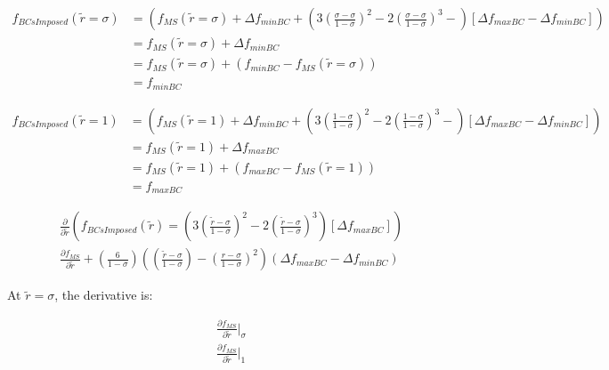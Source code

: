 \documentclass[a4paper]{article}
\begin{document}
\begin{align*}
    f_{BCsImposed}(\widetilde{r} = \sigma) 
    &=
    \left(
        f_{MS}(\widetilde{r} = \sigma) +
        \Delta f_{minBC} +
        \left( 3\left(  \frac{\sigma - \sigma}{1 - \sigma} \right)^2- 
          2\left(  \frac{\sigma - \sigma}{1 - \sigma} \right)^3- 
        \right)
        \left[ \Delta f_{maxBC} - \Delta f_{minBC}  \right] 
    \right)\\
    &=  f_{MS}(\widetilde{r} = \sigma) + \Delta f_{minBC}\\
    &=  f_{MS}(\widetilde{r} = \sigma) + (f_{minBC} - f_{MS}(\widetilde{r} = \sigma)) \\
    &=  f_{minBC}
\end{align*} 


\begin{align*}
    f_{BCsImposed}(\widetilde{r} = 1 ) 
    &=
    \left(
        f_{MS}(\widetilde{r} = 1) +
        \Delta f_{minBC} +
        \left( 3\left(  \frac{1 - \sigma}{1 - \sigma} \right)^2- 
          2\left(  \frac{1 - \sigma}{1 - \sigma} \right)^3- 
        \right)
        \left[ \Delta f_{maxBC} - \Delta f_{minBC}  \right] 
    \right)\\
    &=  f_{MS}(\widetilde{r} = 1) + \Delta f_{maxBC}\\
    &=  f_{MS}(\widetilde{r} = 1) + (f_{maxBC} - f_{MS}(\widetilde{r} = 1)) \\
    &=  f_{maxBC}
\end{align*} 


\begin{align*}
    \frac{\partial}{\partial \widetilde{r}}\left(  f_{BCsImposed}(\widetilde{r}) =
    \left(
        3 \left(  \frac{\widetilde{r} - \sigma }{ 1 - \sigma}\right)^2- 
        2 \left( \frac{\widetilde{r} - \sigma}{1 - \sigma} \right)^3 
    \right)
    \left[ \Delta f_{maxBC} \right]\right) \\
    \frac{\partial f_{MS}}{\partial \widetilde{r}} + 
    \left( \frac{6}{1-\sigma} \right)
    \left( 
        \left( \frac{\widetilde{r} - \sigma}{1 - \sigma} \right) -
    \left( \frac{r - \sigma}{1 - \sigma} \right)^2 \right)
    \left( \Delta f_{maxBC} - \Delta f_{minBC} \right)
\end{align*} 


At $\widetilde{r} = \sigma$, the derivative is: 

\begin{align*}
    \frac{\partial f_{MS}}{\partial \widetilde{r}}|_{\sigma} \\
    \frac{\partial f_{MS}}{\partial \widetilde{r}}|_{1} 
\end{align*}
\end{document}

